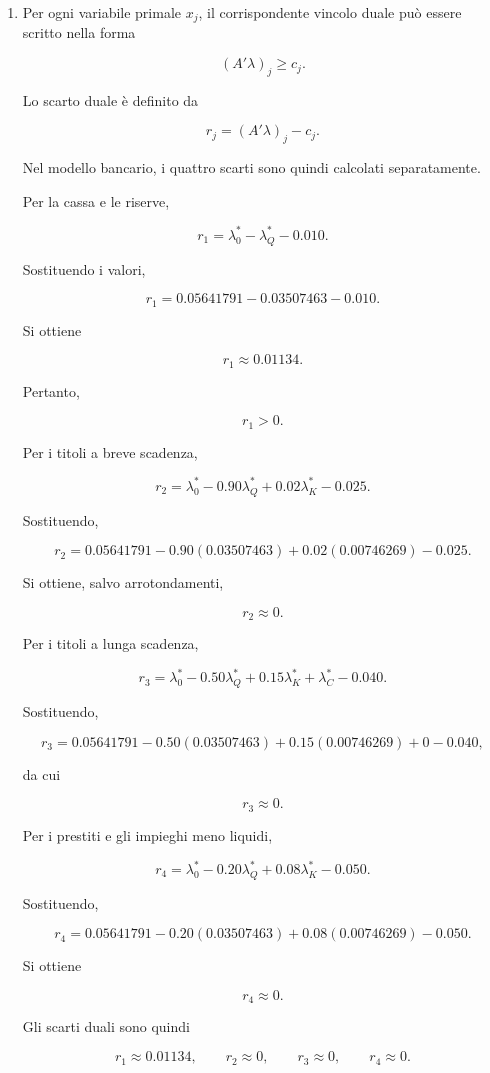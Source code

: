\begin{enumerate}
\item Per ogni variabile primale $x_j$, il corrispondente vincolo duale pu\`o
essere scritto nella forma

\[
(A'\lambda)_j
\geq
c_j.
\]

Lo scarto duale \`e definito da

\[
r_j
=
(A'\lambda)_j-c_j.
\]

Nel modello bancario, i quattro scarti sono quindi calcolati separatamente.

Per la cassa e le riserve,

\[
r_1
=
\lambda_0^*
-
\lambda_Q^*
-
0.010.
\]

Sostituendo i valori,

\[
r_1
=
0.05641791
-
0.03507463
-
0.010.
\]

Si ottiene

\[
r_1
\approx
0.01134.
\]

Pertanto,

\[
r_1>0.
\]

Per i titoli a breve scadenza,

\[
r_2
=
\lambda_0^*
-
0.90\lambda_Q^*
+
0.02\lambda_K^*
-
0.025.
\]

Sostituendo,

\[
r_2
=
0.05641791
-
0.90(0.03507463)
+
0.02(0.00746269)
-
0.025.
\]

Si ottiene, salvo arrotondamenti,

\[
r_2
\approx
0.
\]

Per i titoli a lunga scadenza,

\[
r_3
=
\lambda_0^*
-
0.50\lambda_Q^*
+
0.15\lambda_K^*
+
\lambda_C^*
-
0.040.
\]

Sostituendo,

\[
r_3
=
0.05641791
-
0.50(0.03507463)
+
0.15(0.00746269)
+
0
-
0.040,
\]

da cui

\[
r_3
\approx
0.
\]

Per i prestiti e gli impieghi meno liquidi,

\[
r_4
=
\lambda_0^*
-
0.20\lambda_Q^*
+
0.08\lambda_K^*
-
0.050.
\]

Sostituendo,

\[
r_4
=
0.05641791
-
0.20(0.03507463)
+
0.08(0.00746269)
-
0.050.
\]

Si ottiene

\[
r_4
\approx
0.
\]

Gli scarti duali sono quindi

\[
r_1
\approx
0.01134,
\qquad
r_2
\approx
0,
\qquad
r_3
\approx
0,
\qquad
r_4
\approx
0.
\]


\end{enumerate}
